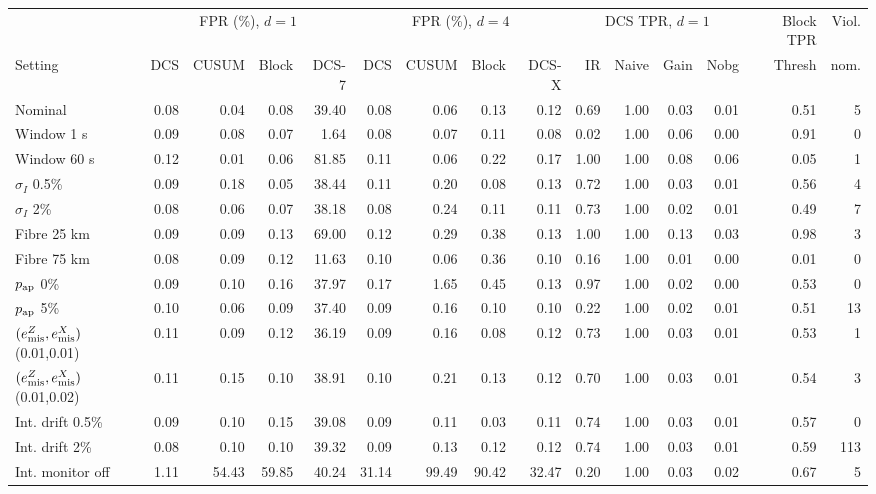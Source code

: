 \begin{tabular}{lrrrrrrrrrrrrrr}
\hline
& \multicolumn{4}{c}{FPR (\%), $d=1$} & \multicolumn{4}{c}{FPR (\%), $d=4$} & \multicolumn{4}{c}{DCS TPR, $d=1$} & Block TPR & Viol.\\
Setting & DCS & CUSUM & Block & DCS-7 & DCS & CUSUM & Block & DCS-X & IR & Naive & Gain & Nobg & Thresh & nom.\\
\hline
Nominal & 0.08 & 0.04 & 0.08 & 39.40 & 0.08 & 0.06 & 0.13 & 0.12 & 0.69 & 1.00 & 0.03 & 0.01 & 0.51 & 5\\
Window 1 s & 0.09 & 0.08 & 0.07 & 1.64 & 0.08 & 0.07 & 0.11 & 0.08 & 0.02 & 1.00 & 0.06 & 0.00 & 0.91 & 0\\
Window 60 s & 0.12 & 0.01 & 0.06 & 81.85 & 0.11 & 0.06 & 0.22 & 0.17 & 1.00 & 1.00 & 0.08 & 0.06 & 0.05 & 1\\
$\sigma_I$ 0.5\% & 0.09 & 0.18 & 0.05 & 38.44 & 0.11 & 0.20 & 0.08 & 0.13 & 0.72 & 1.00 & 0.03 & 0.01 & 0.56 & 4\\
$\sigma_I$ 2\% & 0.08 & 0.06 & 0.07 & 38.18 & 0.08 & 0.24 & 0.11 & 0.11 & 0.73 & 1.00 & 0.02 & 0.01 & 0.49 & 7\\
Fibre 25 km & 0.09 & 0.09 & 0.13 & 69.00 & 0.12 & 0.29 & 0.38 & 0.13 & 1.00 & 1.00 & 0.13 & 0.03 & 0.98 & 3\\
Fibre 75 km & 0.08 & 0.09 & 0.12 & 11.63 & 0.10 & 0.06 & 0.36 & 0.10 & 0.16 & 1.00 & 0.01 & 0.00 & 0.01 & 0\\
$p_{\rm ap}$ 0\% & 0.09 & 0.10 & 0.16 & 37.97 & 0.17 & 1.65 & 0.45 & 0.13 & 0.97 & 1.00 & 0.02 & 0.00 & 0.53 & 0\\
$p_{\rm ap}$ 5\% & 0.10 & 0.06 & 0.09 & 37.40 & 0.09 & 0.16 & 0.10 & 0.10 & 0.22 & 1.00 & 0.02 & 0.01 & 0.51 & 13\\
$(e_{\rm mis}^Z, e_{\rm mis}^X)$ (0.01,0.01) & 0.11 & 0.09 & 0.12 & 36.19 & 0.09 & 0.16 & 0.08 & 0.12 & 0.73 & 1.00 & 0.03 & 0.01 & 0.53 & 1\\
$(e_{\rm mis}^Z, e_{\rm mis}^X)$ (0.01,0.02) & 0.11 & 0.15 & 0.10 & 38.91 & 0.10 & 0.21 & 0.13 & 0.12 & 0.70 & 1.00 & 0.03 & 0.01 & 0.54 & 3\\
Int. drift 0.5\% & 0.09 & 0.10 & 0.15 & 39.08 & 0.09 & 0.11 & 0.03 & 0.11 & 0.74 & 1.00 & 0.03 & 0.01 & 0.57 & 0\\
Int. drift 2\% & 0.08 & 0.10 & 0.10 & 39.32 & 0.09 & 0.13 & 0.12 & 0.12 & 0.74 & 1.00 & 0.03 & 0.01 & 0.59 & 113\\
Int. monitor off & 1.11 & 54.43 & 59.85 & 40.24 & 31.14 & 99.49 & 90.42 & 32.47 & 0.20 & 1.00 & 0.03 & 0.02 & 0.67 & 5\\

\end{tabular}
